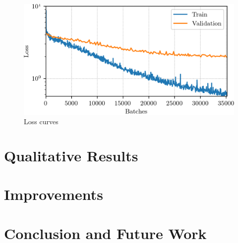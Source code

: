 \documentclass[conference]{IEEEtran}
\begin{document}
\begin{figure}[htbp]
    \centerline{\includegraphics[width=\columnwidth]{loss.png}}
    \caption{Loss curves}
    \label{loss_curves}
\end{figure}

\section{Qualitative Results}

\section{Improvements}

\section{Conclusion and Future Work}





\end{document}

